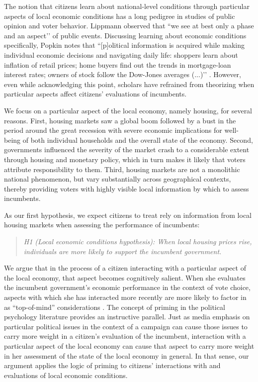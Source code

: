 \documentclass[12pt,a4paper]{article}
\begin{document}
	The notion that citizens learn about national-level conditions through particular aspects of local economic conditions has a long pedigree in studies of public opinion and voter behavior. Lippmann \citeyearpar[][p. 79]{lippmann1946public} observed that ``we see at best only a phase and an aspect’’ of public events. Discussing learning about economic conditions specifically, Popkin \citeyearpar[][p. 24]{popkin1994reasoning} notes that ``[p]olitical information is acquired while making individual economic decisions and navigating daily life: shoppers learn about inflation of retail prices; home buyers find out the trends in mortgage-loan interest rates; owners of stock follow the Dow-Jones averages (...)’’ \cite[see also][p. 5]{fiorina1981retrospective}. However, even while acknowledging this point, scholars have refrained from theorizing when particular aspects affect citizens’ evaluations of incumbents. 
		
	 We focus on a particular aspect of the local economy, namely housing, for several reasons. First, housing markets saw a global boom followed by a bust in the period around the great recession with severe economic implications for well-being of both individual households and the overall state of the economy. Second, governments influenced the severity of the market crash to a considerable extent through housing and monetary policy, which in turn makes it likely that voters attribute responsibility to them. Third, housing markets are not a monolithic national phenomenon, but vary substantially across geographical contexts, thereby providing voters with highly visible local information by which to assess incumbents. 

	As our first hypothesis, we expect citizens to treat rely on information from local housing markets when assessing the performance of incumbents: 

	\newcommand{\hone}{the local economic conditions hypothesis}

	\begin{quote}
		\textit{H1 (Local economic conditions hypothesis): When local housing prices rise, individuals are more likely to support the incumbent government.}
	\end{quote}
	
	We argue that in the process of a citizen interacting with a particular aspect of the local economy, that aspect becomes cognitively salient. When she evaluates the incumbent government’s economic performance in the context of vote choice, aspects with which she has interacted more recently are more likely to factor in as “top-of-mind” considerations \citep{zaller1992nature}. The concept of priming in the political psychology literature provides an instructive parallel. Just as media emphasis on particular political issues in the context of a campaign can cause those issues to carry more weight in a citizen’s evaluation of the incumbent, interaction with a particular aspect of the local economy can cause that aspect to carry more weight in her assessment of the state of the local economy in general. In that sense, our argument applies the logic of priming to citizens’ interactions with and evaluations of local economic conditions. 
	
\end{document}
